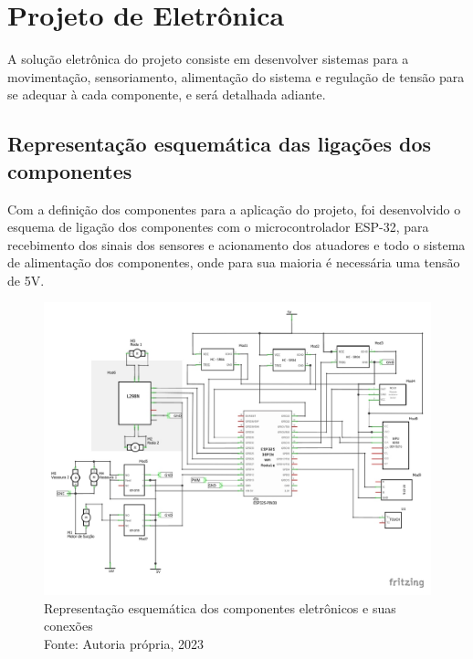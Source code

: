 \newpage
\pagebreak
\clearpage
\section{Projeto de Eletrônica}

A solução eletrônica do projeto consiste em desenvolver sistemas para a movimentação, sensoriamento, alimentação do sistema e regulação de tensão para se adequar à cada componente, e será detalhada adiante.
\subsection{Representação esquemática das ligações dos componentes} 
Com a definição dos componentes para a aplicação do projeto, foi desenvolvido o esquema de ligação dos componentes com o microcontrolador ESP-32\cite{ESPRESSIFMANUAL}, para recebimento dos sinais dos sensores e acionamento dos atuadores e todo o sistema de alimentação dos componentes, onde para sua maioria é necessária uma tensão de 5V.

\begin{figure}[H]
\centering
\includegraphics[width=1.0\textwidth]{editaveis/aa.jpg}
\caption{Representação esquemática dos componentes eletrônicos e suas conexões \\ Fonte: Autoria própria, 2023}

\label{eletroesq}
\end{figure}

